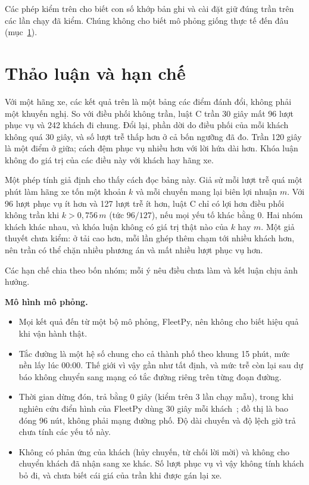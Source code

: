 Các phép kiểm trên cho biết con số khớp bản ghi và cài đặt giữ đúng trần trên các lần chạy đã kiểm. Chúng không cho
biết mô phỏng giống thực tế đến đâu (mục~\ref{muc:c4-thaoluan}).

\section{Thảo luận và hạn chế}
\label{muc:c4-thaoluan}

Với một hãng xe, các kết quả trên là một bảng các điểm đánh đổi, không phải một khuyến nghị. So với điều phối không
trần, luật C trần 30 giây mất 96 lượt phục vụ và 242 khách đi chung. Đổi lại, phần dời do điều phối của mỗi khách
không quá 30 giây, và số lượt trễ thấp hơn ở cả bốn ngưỡng đã đo. Trần 120 giây là một điểm ở giữa; cách đệm phục vụ
nhiều hơn với lời hứa dài hơn. Khóa luận không đo giá trị của các điều này với khách hay hãng xe.

Một phép tính giả định cho thấy cách đọc bảng này. Giả sử mỗi lượt trễ quá một phút làm hãng xe tốn một khoản $k$ và
mỗi chuyến mang lại biên lợi nhuận $m$. Với 96 lượt phục vụ ít hơn và 127 lượt trễ ít hơn, luật C chỉ có lợi hơn điều
phối không trần khi $k > 0{,}756\,m$ (tức $96/127$), nếu mọi yếu tố khác bằng 0. Hai nhóm khách khác nhau, và khóa
luận không có giá trị thật nào của $k$ hay $m$. Một giả thuyết chưa kiểm: ở tải cao hơn, mỗi lần ghép thêm chạm tới
nhiều khách hơn, nên trần có thể chặn nhiều phương án và mất nhiều lượt phục vụ hơn.

Các hạn chế chia theo bốn nhóm; mỗi ý nêu điều chưa làm và kết luận chịu ảnh hưởng.

\textbf{Mô hình mô phỏng.}
\begin{itemize}[leftmargin=1.2cm,itemsep=2pt,topsep=3pt]
\item Mọi kết quả đến từ một bộ mô phỏng, FleetPy, nên không cho biết hiệu quả khi vận hành thật.
\item Tắc đường là một hệ số chung cho cả thành phố theo khung 15 phút, mức nền lấy lúc 00:00. Thế giới vì vậy gần
như tất định, và mức trễ còn lại sau dự báo không chuyển sang mạng có tắc đường riêng trên từng đoạn đường.
\item Thời gian dừng đón, trả bằng 0 giây (kiểm trên 3 lần chạy mẫu), trong khi nghiên cứu điển hình của FleetPy dùng
30 giây mỗi khách~\cite{engelhardt2026}; đồ thị là bao đóng 96 nút, không phải mạng đường phố. Độ dài chuyến và độ
lệch giờ trả chưa tính các yếu tố này.
\item Không có phản ứng của khách (hủy chuyến, từ chối lời mời) và không cho chuyển khách đã nhận sang xe khác. Số
lượt phục vụ vì vậy không tính khách bỏ đi, và chưa biết cái giá của trần khi được gán lại xe.
\end{itemize}

